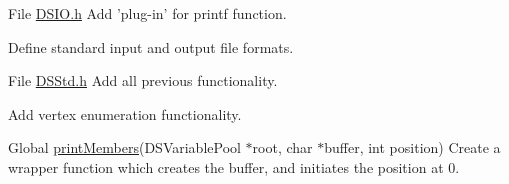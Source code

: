 \label{todo__todo000001}
\hypertarget{todo__todo000001}{}
 
\begin{DoxyDescription}
\item[File \hyperlink{_d_s_i_o_8h}{DSIO.h} ]Add 'plug-\/in' for printf function. 

Define standard input and output file formats.


\end{DoxyDescription}

\label{todo__todo000002}
\hypertarget{todo__todo000002}{}
 
\begin{DoxyDescription}
\item[File \hyperlink{_d_s_std_8h}{DSStd.h} ]Add all previous functionality. 

Add vertex enumeration functionality.


\end{DoxyDescription}

\label{todo__todo000003}
\hypertarget{todo__todo000003}{}
 
\begin{DoxyDescription}
\item[Global \hyperlink{_d_s_variable_8c_aa807b488d1b5c23e628a63e99ef8d0d9}{printMembers}(DSVariablePool $\ast$root, char $\ast$buffer, int position) ]Create a wrapper function which creates the buffer, and initiates the position at 0. 
\end{DoxyDescription}